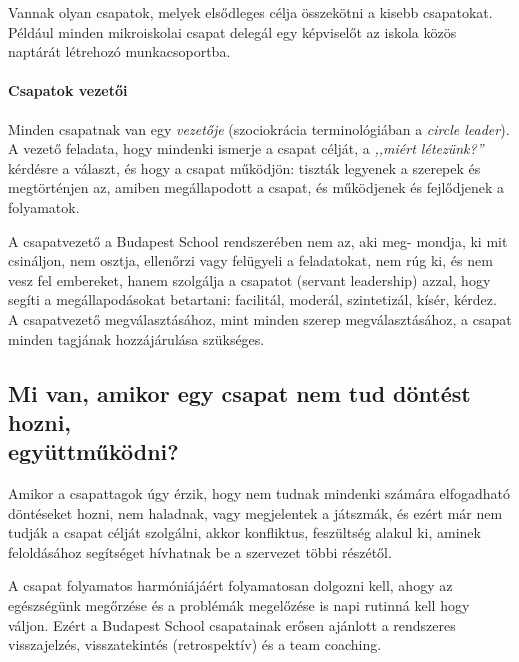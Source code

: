 Vannak olyan csapatok, melyek elsődleges célja összekötni a kisebb csapatokat. Például minden mikroiskolai csapat delegál egy képviselőt az iskola közös naptárát létrehozó munka\-csoportba.

\paragraph{Csapatok vezetői}

Minden csapatnak van egy \emph{vezetője} (szociokrácia terminológiában a
\emph{circle leader}). A vezető feladata, hogy mindenki ismerje a csapat célját, a \emph{,,miért létezünk?''} kérdésre a választ, és hogy a csapat működjön: tiszták legyenek a szerepek és megtörténjen az, amiben megállapodott a csapat, és működjenek és fejlődjenek a folyamatok.

A csapatvezető a Budapest School rendszerében nem az, aki
meg-\linebreak
mondja, ki mit csináljon, nem osztja, ellenőrzi vagy felügyeli a feladatokat, nem rúg ki, és nem vesz fel embereket, hanem szolgálja a csapatot (servant leadership) azzal, hogy segíti a megállapodásokat betartani: facilitál, moderál, szintetizál, kísér, kérdez. A csapatvezető megválasztásához, mint minden szerep megválasztásához, a csapat minden tagjának hozzájárulása szükséges.




\subsection{Mi van, amikor egy csapat nem tud döntést hozni,\\ együttműködni?}

Amikor a csapattagok úgy érzik, hogy nem tudnak mindenki számára elfogadható döntéseket hozni, nem haladnak, vagy megjelentek a játszmák, és ezért már nem tudják a csapat célját szolgálni, akkor konfliktus, feszültség alakul ki, aminek feloldásához segítséget hívhatnak be a szervezet töb\-bi részétől. %

A csapat folyamatos harmóniájáért folyamatosan dolgozni kell, ahogy az egészségünk megőrzése és a problémák megelőzése is napi rutinná kell hogy váljon. Ezért a Budapest School csapatainak erősen ajánlott a rendszeres visszajelzés, visszatekintés (retrospektív) és a team coaching.
